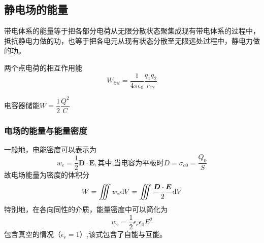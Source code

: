 \subsection{静电场的能量}
带电体系的能量等于把各部分电荷从无限分散状态聚集成现有带电体系的过程中，抵抗静电力做的功，也等于把各电元从现有状态分散至无限远处过程中，静电力做的功。

两个点电荷的相互作用能
\begin{equation}\label{key}
	W_{int}=\dfrac{1}{4\pi \epsilon_0}\dfrac{q_1q_2}{r_{12}}
\end{equation}

电容器储能$ W=\dfrac{1}{2}\dfrac{Q^2}{C} $
\subsubsection{电场的能量与能量密度}
一般地，电能密度可以表示为
\begin{equation}\label{key}
	w_e=\dfrac{1}{2}\bm{D}\cdot \bm{E},\text{其中,当电容为平板时}D=\sigma_{e0}=\dfrac{Q_0}{S}
\end{equation}
故电场能量为密度的体积分
\begin{equation}\label{key}
	W=\iiint w_e \mathrm{d} V=\iiint \dfrac{\bm{D}\cdot \bm{E}}{2}\mathrm{d} V
\end{equation}
特别地，在各向同性的介质，能量密度中可以简化为
\begin{equation}\label{key}
	w_e=\dfrac{1}{2}\epsilon_r\epsilon_0 E^2
\end{equation}
包含真空的情况（$ \epsilon_r=1 $）,该式包含了自能与互能。